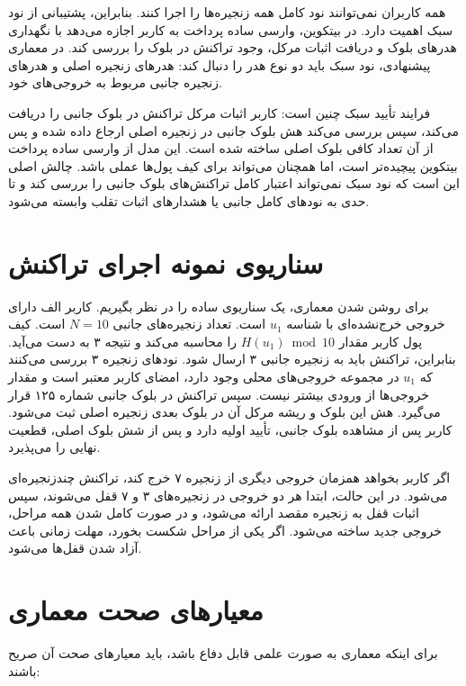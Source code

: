 همه کاربران نمی‌توانند نود کامل همه زنجیره‌ها را اجرا کنند. بنابراین، پشتیبانی از نود سبک اهمیت دارد. در بیتکوین، وارسی ساده پرداخت به کاربر اجازه می‌دهد با نگهداری هدرهای بلوک و دریافت اثبات مرکل، وجود تراکنش در بلوک را بررسی کند. در معماری پیشنهادی، نود سبک باید دو نوع هدر را دنبال کند: هدرهای زنجیره اصلی و هدرهای زنجیره جانبی مربوط به خروجی‌های خود.

فرایند تأیید سبک چنین است: کاربر اثبات مرکل تراکنش در بلوک جانبی را دریافت می‌کند، سپس بررسی می‌کند هش بلوک جانبی در زنجیره اصلی ارجاع داده شده و پس از آن تعداد کافی بلوک اصلی ساخته شده است. این مدل از وارسی ساده پرداخت بیتکوین پیچیده‌تر است، اما همچنان می‌تواند برای کیف پول‌ها عملی باشد. چالش اصلی این است که نود سبک نمی‌تواند اعتبار کامل تراکنش‌های بلوک جانبی را بررسی کند و تا حدی به نودهای کامل جانبی یا هشدارهای اثبات تقلب وابسته می‌شود.

\section{سناریوی نمونه اجرای تراکنش}

برای روشن شدن معماری، یک سناریوی ساده را در نظر بگیریم. کاربر الف دارای خروجی خرج‌نشده‌ای با شناسه \(u_1\) است. تعداد زنجیره‌های جانبی \(N=10\) است. کیف پول کاربر مقدار \(H(u_1) \bmod 10\) را محاسبه می‌کند و نتیجه ۳ به دست می‌آید. بنابراین، تراکنش باید به زنجیره جانبی ۳ ارسال شود. نودهای زنجیره ۳ بررسی می‌کنند که \(u_1\) در مجموعه خروجی‌های محلی وجود دارد، امضای کاربر معتبر است و مقدار خروجی‌ها از ورودی بیشتر نیست. سپس تراکنش در بلوک جانبی شماره ۱۲۵ قرار می‌گیرد. هش این بلوک و ریشه مرکل آن در بلوک بعدی زنجیره اصلی ثبت می‌شود. کاربر پس از مشاهده بلوک جانبی، تأیید اولیه دارد و پس از شش بلوک اصلی، قطعیت نهایی را می‌پذیرد.

اگر کاربر بخواهد همزمان خروجی دیگری از زنجیره ۷ خرج کند، تراکنش چندزنجیره‌ای می‌شود. در این حالت، ابتدا هر دو خروجی در زنجیره‌های ۳ و ۷ قفل می‌شوند، سپس اثبات قفل به زنجیره مقصد ارائه می‌شود، و در صورت کامل شدن همه مراحل، خروجی جدید ساخته می‌شود. اگر یکی از مراحل شکست بخورد، مهلت زمانی باعث آزاد شدن قفل‌ها می‌شود.

\section{معیارهای صحت معماری}

برای اینکه معماری به صورت علمی قابل دفاع باشد، باید معیارهای صحت آن صریح باشند:

